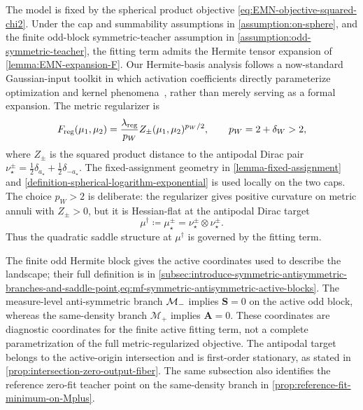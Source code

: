 The model is fixed by the spherical product objective
\cref{eq:EMN-objective-squared-chi2}.  Under the cap and summability assumptions
in \cref{assumption:on-sphere}, and the finite odd-block symmetric-teacher
assumption in \cref{assumption:odd-symmetric-teacher}, the fitting term admits the
Hermite tensor expansion of \cref{lemma:EMN-expansion-F}. Our Hermite-basis analysis follows a now-standard Gaussian-input toolkit in which activation coefficients directly parameterize optimization\citep{arous2021online,abbe23a, bietti2023} and kernel phenomena~\citep{daniely2016toward,murray2023characterizing}, rather than merely serving as a formal expansion.  The metric regularizer
is
\[
    F_{\mathrm{reg}}(\mu_1,\mu_2)
    =
    \frac{\lambda_{\mathrm{reg}}}{p_W}
    Z_\pm(\mu_1,\mu_2)^{p_W/2},
    \qquad
    p_W=2+\delta_W>2,
\]
where \(Z_\pm\) is the squared product distance to the antipodal Dirac pair
\(\nu_\star^\pm=\frac12\delta_{a_\star}+\frac12\delta_{-a_\star}\).  The
fixed-assignment geometry in \cref{lemma-fixed-assignment} and
\cref{definition-spherical-logarithm-exponential} is used locally on the two caps.
The choice \(p_W>2\) is deliberate: the regularizer gives positive curvature on
metric annuli with \(Z_\pm>0\), but it is Hessian-flat at the antipodal Dirac target
\[
    \mu^\dagger
    \coloneq
    \mu_\star^\pm
    =
    \nu_\star^\pm\otimes\nu_\star^\pm .
\]
Thus the quadratic saddle structure at \(\mu^\dagger\) is governed by the fitting
term.

The finite odd Hermite block gives the active coordinates used to describe the
landscape; their full definition is in
\cref{subsec:introduce-symmetric-antisymmetric-branches-and-saddle-point,eq:mf-symmetric-antisymmetric-active-blocks}.
The measure-level anti-symmetric branch
\(\mathcal{M}_{-}\) implies \(\mathbf S=0\) on the active odd block,
whereas the same-density branch \(\mathcal M_+\) implies \(\mathbf A=0\).
These coordinates are diagnostic coordinates for the finite active fitting term,
not a complete parametrization of the full metric-regularized objective.  The
antipodal target belongs to the active-origin intersection and is first-order
stationary, as stated in \cref{prop:intersection-zero-output-fiber}.  The same
subsection also identifies the reference zero-fit teacher point on the
same-density branch in \cref{prop:reference-fit-minimum-on-Mplus}.

